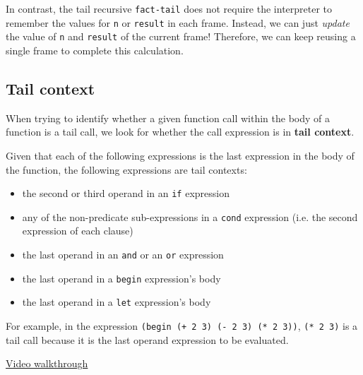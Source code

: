 In contrast, the tail recursive \texttt{fact-tail} does not require the
interpreter to remember the values for \texttt{n} or \texttt{result} in each
frame. Instead, we can just \emph{update} the value of \texttt{n} and
\texttt{result} of the current frame! Therefore, we can keep reusing a single
frame to complete this calculation.

\begin{blocksection}
\subsection*{Tail context}
When trying to identify whether a given function call within the body of a
function is a tail call, we look for whether the call expression is in
\textbf{tail context}.

Given that each of the following expressions is the last expression in 
the body of the function, the following expressions are tail contexts:
\begin{itemize}
\item the second or third operand in an \texttt{if} expression
\item any of the non-predicate sub-expressions in a \texttt{cond} expression
  (i.e. the second expression of each clause)
\item the last operand in an \texttt{and} or an \texttt{or} expression
\item the last operand in a \texttt{begin} expression's body
\item the last operand in a \texttt{let} expression's body
\end{itemize}

For example, in the expression \texttt{(begin (+ 2 3) (- 2 3) (* 2 3))},
\texttt{(* 2 3)} is a tail call because it is the last operand expression to be
evaluated.

\end{blocksection}
\begin{solution}[0.1in]
\href{https://youtu.be/QbtKMreFRl8?t=51s}{Video walkthrough}
\end{solution}

